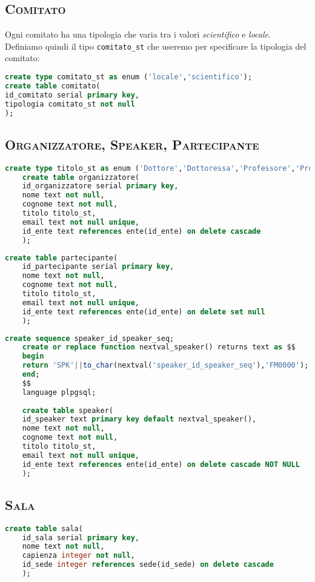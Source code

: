 \subsection{\textsc{Comitato}}
Ogni comitato ha una tipologia che varia tra i valori \textit{scientifico} e \textit{locale}. Definiamo quindi il tipo \texttt{comitato\_st} che useremo per specificare la tipologia del comitato:
\begin{lstlisting}[language=SQL,style=mystyle]
create type comitato_st as enum ('locale','scientifico');
create table comitato(
id_comitato serial primary key,
tipologia comitato_st not null
);
\end{lstlisting}
\subsection{\textsc{Organizzatore, Speaker, Partecipante}}
\begin{lstlisting}[language=SQL,style=mystyle]
	create type titolo_st as enum ('Dottore','Dottoressa','Professore','Professoressa','Assistente','Ricercatore','Ricercatrice','Ingegnere');
	create table organizzatore(
	id_organizzatore serial primary key,
	nome text not null,
	cognome text not null,
	titolo titolo_st,
	email text not null unique,
	id_ente text references ente(id_ente) on delete cascade
	);
\end{lstlisting}
\begin{lstlisting}[language=SQL,style=mystyle]
	create table partecipante(
	id_partecipante serial primary key,
	nome text not null,
	cognome text not null,
	titolo titolo_st,
	email text not null unique, 
	id_ente text references ente(id_ente) on delete set null
	);
\end{lstlisting}
\begin{lstlisting}[language=SQL,style=mystyle]
	create sequence speaker_id_speaker_seq;
	create or replace function nextval_speaker() returns text as $$
	begin
	return 'SPK'||to_char(nextval('speaker_id_speaker_seq'),'FM0000');
	end;
	$$
	language plpgsql;
	
	create table speaker(
	id_speaker text primary key default nextval_speaker(),
	nome text not null,
	cognome text not null,
	titolo titolo_st,
	email text not null unique,
	id_ente text references ente(id_ente) on delete cascade NOT NULL
	);
\end{lstlisting}
\subsection{\textsc{Sala}}
\begin{lstlisting}[language=SQL,style=mystyle]
	create table sala(
	id_sala serial primary key,
	nome text not null,
	capienza integer not null,
	id_sede integer references sede(id_sede) on delete cascade
	);
\end{lstlisting}
